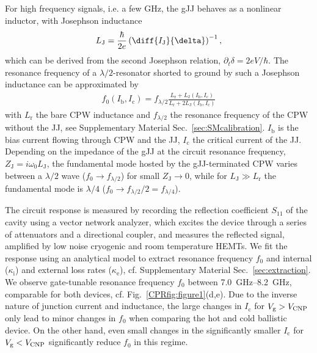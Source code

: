 For high frequency signals, i.e. a few \si{\giga\hertz}, the gJJ behaves as a nonlinear inductor, with Josephson inductance
%
\begin{align}
L_\text{J} = \frac{\hbar}{2e}\left(\diff{I_\text{J}}{\delta}\right)^{-1},
\label{CPReq:LJgeneral}
\end{align}
%
which can be derived from the second Josephson relation, $\partial_t\delta=2e V/\hbar$.
%
The resonance frequency of a $\lambda/2$-resonator shorted to ground by such a Josephson inductance can be approximated by
\begin{align}
f_0\left(I_\text{b},I_\text{c}\right) = f_{\lambda/2} \frac{L_\text{r}+L_\text{J}\left(I_\text{b}, I_\text{c}\right)}{L_\text{r} +  2L_\text{J}\left(I_\text{b}, I_\text{c}\right)}
\label{CPReq:Pogorzalek}
\end{align}
%
with $L_\text{r}$ the bare CPW inductance and $f_{\lambda/2}$ the resonance frequency of the CPW without the JJ, see Supplementary Material Sec.~\ref{sec:SMcalibration}.
%
$I_\text{b}$ is the bias current flowing through CPW and the JJ, $I_\text{c}$ the critical current of the JJ.
%
Depending on the impedance of the gJJ at the circuit resonance frequency, $Z_\text{J}=i\omega_0 L_\text{J}$, the fundamental mode hosted by the gJJ-terminated CPW varies between a $\lambda/2$ wave ($f_0\rightarrow f_{\lambda/2}$) for small $Z_\text{J}\rightarrow0$, while for $L_\text{J}\gg L_\text{r}$ the fundamental mode is $\lambda/4$ ($f_0 \rightarrow f_{\lambda/2}/2=f_{\lambda/4}$).

The circuit response is measured by recording the reflection coefficient $S_{11}$ of the cavity using a vector network analyzer, which excites the device through a series of attenuators and a directional coupler, and measures the reflected signal, amplified by low noise cryogenic and room temperature HEMTs. 
%
We fit the response using an analytical model to extract resonance frequency $f_0$ and internal ($\kappa_\text{i}$) and external loss rates ($\kappa_\text{e}$), cf. Supplementary Material Sec.~\ref{sec:extraction}.
%
We observe gate-tunable resonance frequency $f_0$ between \SIrange{7.0}{8.2}{\giga\hertz}, comparable for both devices, cf. Fig.~\ref{CPRfig:figure1}(d,e).
%
Due to the inverse nature of junction current and inductance, the large changes in $I_\text{c}$ for $V_\text{g}>V_{\rm CNP}$ only lead to minor changes in $f_0$ when comparing the hot and cold ballistic device.
%
On the other hand, even small changes in the significantly smaller $I_\text{c}$ for $V_\text{g}<V_{\rm CNP}$ significantly reduce $f_0$ in this regime.

